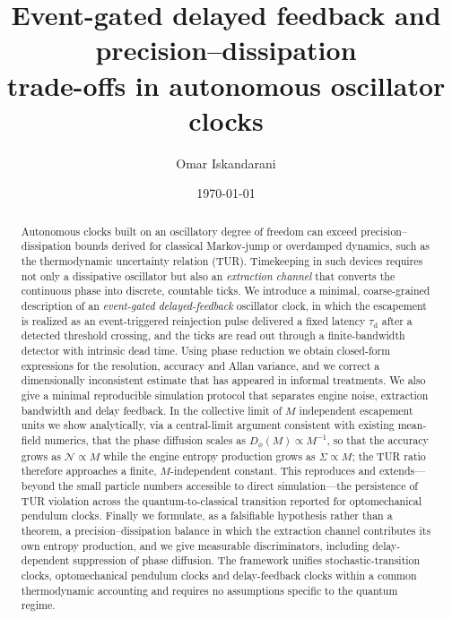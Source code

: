 \documentclass[aps,pre,reprint,amsmath,amssymb,floatfix,nofootinbib]{revtex4-2}
\newcommand{\Sdot}{\dot{\Sigma}}
\newcommand{\Dphi}{D_{\phi}}
\newcommand{\taud}{\tau_{\mathrm{d}}}
\begin{document}
\title{Event-gated delayed feedback and precision--dissipation\\
trade-offs in autonomous oscillator clocks}

\author{Omar Iskandarani}

\date{\today}

\begin{abstract}
Autonomous clocks built on an oscillatory degree of freedom can exceed
precision--dissipation bounds derived for classical Markov-jump or
overdamped dynamics, such as the thermodynamic uncertainty relation
(TUR). Timekeeping in such devices requires not only a dissipative
oscillator but also an \emph{extraction channel} that converts the
continuous phase into discrete, countable ticks. We introduce a minimal,
coarse-grained description of an \emph{event-gated delayed-feedback}
oscillator clock, in which the escapement is realized as an
event-triggered reinjection pulse delivered a fixed latency $\taud$ after
a detected threshold crossing, and the ticks are read out through a
finite-bandwidth detector with intrinsic dead time. Using phase reduction
we obtain closed-form expressions for the resolution, accuracy and Allan
variance, and we correct a dimensionally inconsistent estimate that has
appeared in informal treatments. We also give a minimal reproducible
simulation protocol that separates engine noise, extraction bandwidth and
delay feedback. In the collective limit of $M$
independent escapement units we show analytically, via a central-limit
argument consistent with existing mean-field numerics, that the phase
diffusion scales as $\Dphi(M)\propto M^{-1}$, so that the accuracy grows
as $\mathcal{N}\propto M$ while the engine entropy production grows as
$\Sdot\propto M$; the TUR ratio therefore approaches a finite,
$M$-independent constant. This reproduces and extends---beyond the small
particle numbers accessible to direct simulation---the persistence of TUR
violation across the quantum-to-classical transition reported for
optomechanical pendulum clocks. Finally we formulate, as a falsifiable
hypothesis rather than a theorem, a precision--dissipation balance in
which the extraction channel contributes its own entropy production, and
we give measurable discriminators, including delay-dependent suppression
of phase diffusion. The framework unifies stochastic-transition clocks,
optomechanical pendulum clocks and delay-feedback clocks within a common
thermodynamic accounting and requires no assumptions specific to the quantum regime.
\end{abstract}
\end{document}
